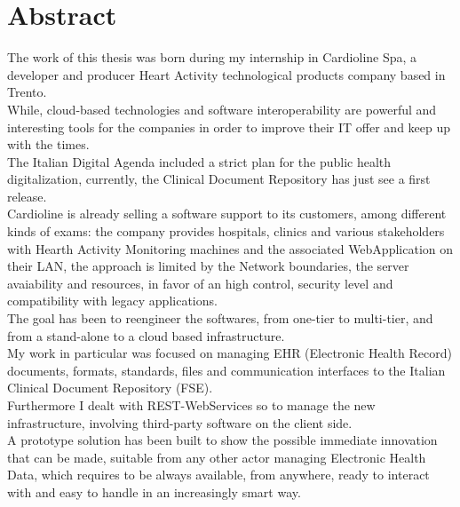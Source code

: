 \chapter*{Abstract} %
\label{abstract}

The work of this thesis was born during my internship in Cardioline Spa, a developer and producer Heart Activity technological products company based in Trento.\\While, cloud-based technologies and software interoperability are powerful and interesting tools for the companies in order to improve their IT offer and keep up with the times.\\The Italian Digital Agenda included a strict plan for the public health digitalization, currently, the Clinical Document Repository has just see a first release.\\Cardioline is already selling a software support to its customers, among different kinds of exams: the company provides hospitals, clinics and various stakeholders with Hearth Activity Monitoring machines and the associated WebApplication on their LAN, the approach is limited by the Network boundaries, the server avaiability and resources, in favor of an high control, security level and compatibility with legacy applications.\\The goal has been to reengineer the softwares, from one-tier to multi-tier, and from a stand-alone to a cloud based infrastructure.\\My work in particular was focused on managing EHR (Electronic Health Record) documents, formats, standards, files and communication interfaces to the Italian Clinical Document Repository (FSE).\\Furthermore I dealt with REST-WebServices so to manage the new infrastructure, involving third-party software on the client side.\\A prototype solution has been built to show the possible immediate innovation that can be made, suitable from any other actor managing Electronic Health Data, which requires to be always available, from anywhere, ready to interact with and easy to handle in an increasingly smart way.
